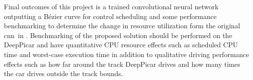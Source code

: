 \documentclass[12pt]{report}
\newcommand{\CNN}{\acrshort{cnn}}
\begin{document}
Final outcomes of this project is a trained convolutional neural network outputting a B\'ezier curve for control scheduling and some performance benchmarking to determine the change in resource utilization form the original \CNN\ in \cite{bechtel2018}. Benchmarking of the proposed solution should be performed on the DeepPicar and have quantitative CPU resource effects such as scheduled CPU time and worst-case execution time in addition to qualitative driving performance effects such as how far around the track DeepPicar drives and how many times the car drives outside the track bounds.

\renewcommand{\bibname}{References}


\end{document}

